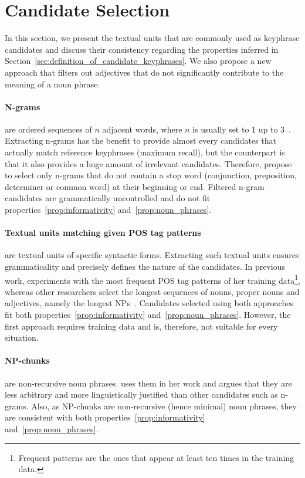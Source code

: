 \section{Candidate Selection}
\label{sec:candidate_extraction}
  In this section, we present the textual units that are commonly used as
  keyphrase candidates and discuss their consistency regarding the properties
  inferred in Section~\ref{sec:definition_of_candidate_keyphrases}. We also
  propose a new approach that filters out adjectives that do not significantly
  contribute to the meaning of a noun phrase.

  \paragraph{N-grams} are ordered sequences of $n$ adjacent words, where $n$ is
  usually set to 1 up to 3~\cite{witten1999kea}. Extracting n-grams has the
  benefit to provide almost every candidates that actually match reference
  keyphrases (maximum recall), but the counterpart is that it also provides a
  huge amount of irrelevant candidates. Therefore, 
  propose to select only n-grams that do not contain a stop word (conjunction,
  preposition, determiner or common word) at their beginning or end. Filtered
  n-gram candidates are grammatically uncontrolled and do not fit
  properties~\ref{prop:informativity} and~\ref{prop:noun_phrases}.

  \paragraph{Textual units matching given POS tag patterns} are textual units of
  specific syntactic forms. Extracting such textual units ensures grammaticality
  and precisely defines the nature of the candidates. In previous work,
   experiments with the most frequent POS
  tag patterns of her training data\footnote{Frequent patterns are the ones that
  appear at least ten times in the training data.}, whereas other researchers
  select the longest sequences of nouns, proper nouns and adjectives, namely
  the longest NPs~\cite{hassan2010conundrums}. Candidates selected using both
  approaches fit both properties~\ref{prop:informativity}
  and~\ref{prop:noun_phrases}. However, the first approach requires training
  data and is, therefore, not suitable for every situation.

  \paragraph{NP-chunks} are non-recursive noun phrases.
   uses them in her work and argues that
  they are less arbitrary and more linguistically justified than other
  candidates such as n-grams. Also, as NP-chunks are non-recursive (hence
  minimal) noun phrases, they are consistent with both
  properties~\ref{prop:informativity} and~\ref{prop:noun_phrases}.

